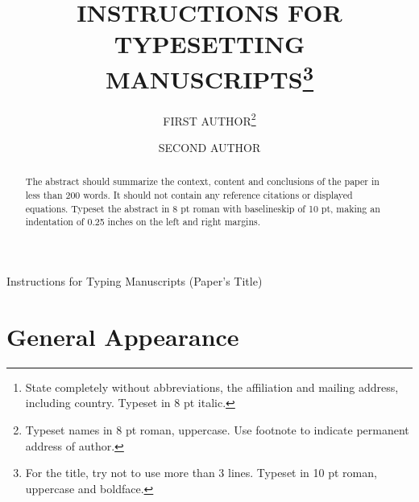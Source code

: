 \documentclass{ws-ijnt}
\begin{document}
{Instructions for Typing Manuscripts (Paper's Title)}

%
\catchline{}{}{}{}{}
%

\title{INSTRUCTIONS FOR TYPESETTING 
MANUSCRIPTS\footnote{For the title, try not to 
use more than 3 lines. Typeset in 10 pt roman, uppercase and boldface.}
}

\author{FIRST AUTHOR\footnote{
Typeset names in 8 pt roman, uppercase. Use footnote to indicate 
permanent address of author.}}

\address{University Department, University Name, Address\\
City, State ZIP/Zone,Country\,\footnote{State completely without 
abbreviations, the affiliation and mailing address, including country. 
Typeset in 8 pt italic.}\\ 
 }

\author{SECOND AUTHOR}

\address{Group, Laboratory, Address\\
City, State ZIP/Zone, Country\\
author\_id@domain\_name }

\maketitle

\begin{history}
\end{history}

\begin{abstract}
The abstract should summarize the context,
content and conclusions of the paper in less than 200 words. It should
not contain any reference citations or displayed equations. Typeset 
the abstract in 8 pt roman with baselineskip of 10 pt, making an
indentation of 0.25 inches on the left and right margins.
\end{abstract}



\section{General Appearance}	
\end{document}
